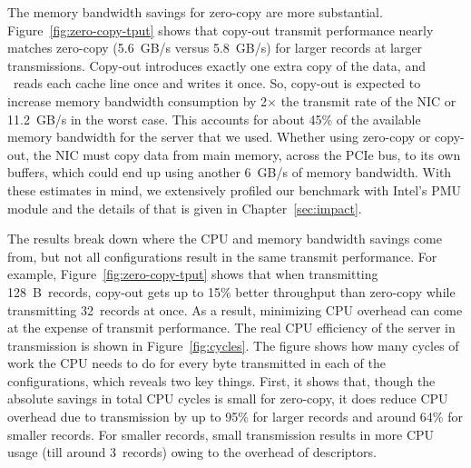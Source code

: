 The memory bandwidth savings for zero-copy are more substantial.
Figure~\ref{fig:zero-copy-tput} shows that copy-out transmit performance nearly
matches zero-copy (5.6~GB/s versus 5.8~GB/s) for larger records at larger transmissions. Copy-out introduces exactly one
extra copy of the data, and \memcpy~reads each cache line once and writes it
once. So, copy-out is expected to increase memory bandwidth consumption
by 2$\times$ the transmit rate of the NIC or 11.2~GB/s in the worst case.  This
accounts for about 45\% of the available memory bandwidth for the server that we used. Whether
using zero-copy or copy-out, the NIC must copy data from main memory, across the PCIe bus, to its own buffers, which
could end up using another 6~GB/s of memory bandwidth. With these estimates in mind, we extensively profiled
 our benchmark with Intel's PMU module and the details of that is given in Chapter~\ref{sec:impact}.





The results break down where the CPU and memory bandwidth savings come from,
but not all configurations result in the same transmit performance. For
example, Figure~\ref{fig:zero-copy-tput} shows that when transmitting
128~B~records, copy-out gets up to 15\% better throughput than zero-copy while transmitting
32~records at once. As a result, minimizing CPU overhead can come at the expense of transmit
performance.  The real CPU efficiency of the server in transmission is shown in
Figure~\ref{fig:cycles}. The figure shows how many cycles of work the CPU needs to do
for every byte transmitted in each of the configurations, which reveals two key things.
First, it shows that, though the absolute savings in total CPU cycles is small
for zero-copy, it does reduce CPU overhead due to transmission by up to 95\% for 
larger records and around 64\% for smaller records. For smaller records, small transmission
results in more CPU usage (till around 3~records) owing to the overhead of descriptors.

